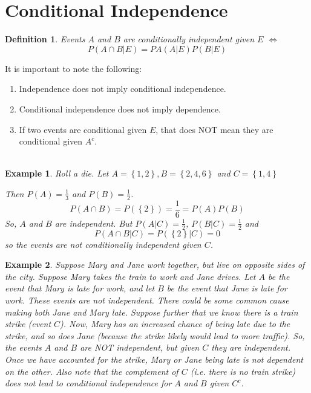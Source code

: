 \documentclass[12pt]{article} %
\newtheorem{defn}{Definition}
\newtheorem{example}{Example}
\begin{document}
\section{Conditional Independence}
\begin{defn}
Events $A$ and $B$ are \emph{conditionally independent given $E$} $\iff$ 
$$P(A\cap B|E) = PA(A|E)P(B|E)$$
\end{defn}
It is important to note the following:
\begin{enumerate}
\item Independence does not imply conditional independence.
\item Conditional independence does not imply dependence.
\item If two events are conditional given $E$, that does NOT mean they are conditional given $A^c$.\\\\
\end{enumerate}
\begin{example}

Roll a die. Let $A = \left\{1,2\right\}, B= \left\{2,4,6\right\}$ and $C=\left\{1,4\right\}$

Then $P(A)=\frac13$ and $P(B)=\frac12$.
$$P(A\cap B) = P(\left\{2\right\}) = \frac16 = P(A)P(B)$$
So, $A$ and $B$ are independent. But $P(A|C) =\frac12$, $P(B|C)=\frac12$ and 
$$P(A\cap B|C) = P(\left\{2\right\}|C) = 0$$
so the events are not conditionally independent given $C$.

\end{example}
\begin{example}

Suppose Mary and Jane work together, but live on opposite sides of the city. Suppose Mary takes the train to work and Jane drives. Let $A$ be the event that Mary is late for work, and let $B$ be the event that Jane is late for work. These events are not independent. There could be some common cause making both Jane and Mary late. Suppose further that we know there is a train strike (event $C$). Now, Mary has an increased chance of being late due to the strike, and so does Jane (because the strike likely would lead to more traffic). So, the events $A$ and $B$ are NOT independent, but given $C$ they are independent. Once we have accounted for the strike, Mary or Jane being late is not dependent on the other. Also note that the complement of $C$ (i.e. there is no train strike) does not lead to conditional independence for $A$ and $B$ given $C^c$.  
\end{example}
\end{document}
